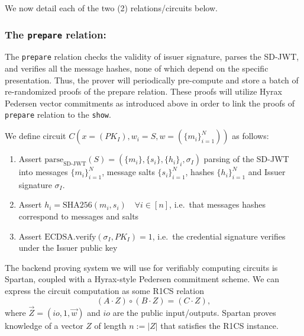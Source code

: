 We now detail each of the two (2) relations/circuits below.

\subsubsection{The \texttt{prepare} relation:}

The \texttt{prepare} relation checks the validity of issuer signature, parses the SD-JWT, and verifies all the message hashes, none of which depend on the specific presentation. 
Thus, the prover will periodically pre-compute and store a batch of re-randomized proofs of the prepare relation. 
These proofs will utilize Hyrax Pedersen vector commitments as introduced above in order to link the proofs of \texttt{prepare} relation to the \texttt{show}. 

\begin{mdframed}[style=zkprotocolwithheader, frametitle=Circuit $C_1$ for the \texttt{prepare} relation]

We define circuit $C(x = (PK_I), w_i = S, w = (\{m_i\}_{i=1}^N))$ as follows:

\begin{enumerate}
\item Assert $\text{parse}_{\text{SD-JWT}}(S) = (\{m_i\}, \{s_i\}, \{h_i\}_i, \sigma_I)$ parsing of the SD-JWT into messages $\{m_i\}_{i=1}^N$, message salts $\{s_i\}_{i=1}^N$, hashes $\{h_i\}_{i=1}^N$ and Issuer signature $\sigma_I$.
\item Assert $h_i = \text{SHA256}(m_i, s_i) \quad \forall i \in [n]$, i.e.\ that messages hashes correspond to messages and salts
\item Assert $\text{ECDSA.verify}(\sigma_I, PK_I) = 1$, i.e.\ the credential signature verifies under the Issuer public key
\end{enumerate}

\end{mdframed}

The backend proving system we will use for verifiably computing circuits is Spartan, coupled with a Hyrax-style Pedersen commitment scheme. 
We can express the circuit computation as some R1CS relation 
\[
(A \cdot Z) \circ (B \cdot Z) = (C \cdot Z),
\]
where $\vec{Z} = (io, 1, \vec{w})$ and $io$ are the public input/outputs. Spartan proves knowledge of a vector $Z$ of length $n := |Z|$ that satisfies the R1CS instance. 

